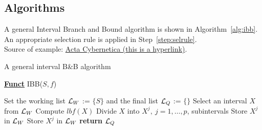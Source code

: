 \subsection{Algorithms}

A general Interval Branch and Bound algorithm is shown in Algorithm~\ref{alg:ibb}. An appropriate selection rule is applied in Step~\ref{step:selrule}.\\
Source of example: \href{https://www.inf.u-szeged.hu/actacybernetica/}{Acta Cybernetica (this is a hyperlink)}.

\begin{algorithm}[H]
\caption{A general interval B\&B algorithm} 
\label{alg:ibb} 
\textbf{\underline{Funct}} IBB($S,f$)
\begin{algorithmic}[1] %
\State Set the working list ${\cal L}_W$ := $\{S\}$ and the final list ${\cal L}_Q$ := $\{\}$     
 \label{alg:igoend}
	\State  Select an interval $X$ from ${\cal L}_W$ \label{step:selrule}  
	\State Compute $lbf(X)$ 		  
	 
		\State Divide $X$ into $X^j,\ j=1,\dots, p$, subintervals   
			 
				\State Store $X^j$ in ${\cal L}_W$ 
			\Else
				\State Store $X^j$ in ${\cal L}_W$ 
			\EndIf
		\EndFor  
	\EndIf
\EndWhile
\State \textbf{return} ${\cal L}_Q$
\end{algorithmic}
\end{algorithm}
